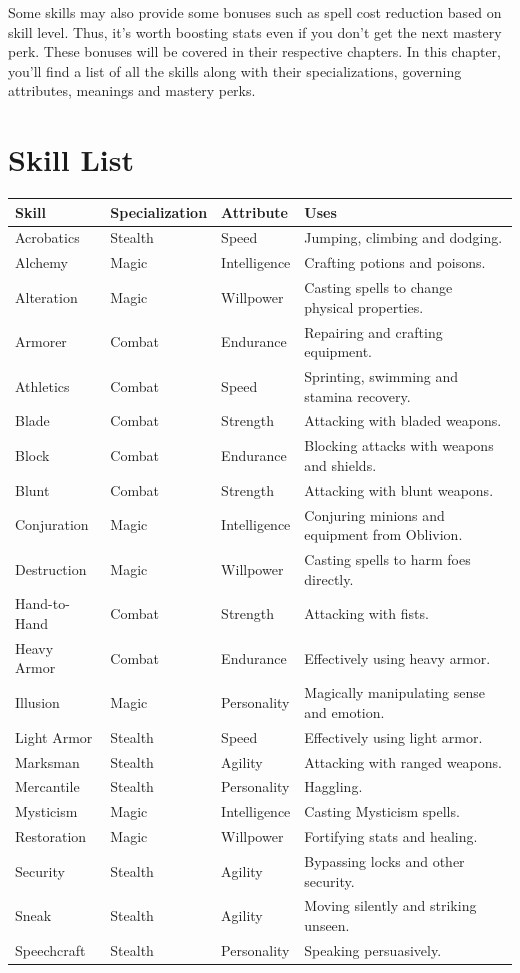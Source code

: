 \documentclass[12pt]{book}
\begin{document}
Some skills may also provide some bonuses such as spell cost reduction based on skill level. Thus, it's worth boosting stats even if you don't get the next mastery perk. These bonuses will be covered in their respective chapters. In this chapter, you'll find a list of all the skills along with their specializations, governing attributes, meanings and mastery perks.

\section{Skill List}

\begin{tabular}{p{}|p{}|p{}|p{}}

Skill & Specialization & Attribute & Uses\\ \hline
Acrobatics & Stealth & Speed & Jumping, climbing and dodging.\\ \hline
Alchemy & Magic & Intelligence & Crafting potions and poisons.\\ \hline
Alteration & Magic & Willpower & Casting spells to change physical properties.\\ \hline
Armorer & Combat & Endurance & Repairing and crafting equipment.\\ \hline
Athletics & Combat & Speed & Sprinting, swimming and stamina recovery.\\ \hline
Blade & Combat & Strength & Attacking with bladed weapons.\\ \hline
Block & Combat & Endurance & Blocking attacks with weapons and shields.\\ \hline
Blunt & Combat & Strength & Attacking with blunt weapons.\\ \hline
Conjuration & Magic & Intelligence & Conjuring minions and equipment from Oblivion.\\ \hline
Destruction & Magic & Willpower & Casting spells to harm foes directly.\\ \hline
Hand-to-Hand & Combat & Strength & Attacking with fists.\\ \hline
Heavy Armor & Combat & Endurance & Effectively using heavy armor.\\ \hline
Illusion & Magic & Personality & Magically manipulating sense and emotion.\\ \hline
Light Armor & Stealth & Speed & Effectively using light armor.\\ \hline
Marksman & Stealth & Agility & Attacking with ranged weapons.\\ \hline
Mercantile & Stealth & Personality & Haggling.\\ \hline
Mysticism & Magic & Intelligence & Casting Mysticism spells.\\ \hline
Restoration & Magic & Willpower & Fortifying stats and healing.\\ \hline
Security & Stealth & Agility & Bypassing locks and other security.\\ \hline
Sneak & Stealth & Agility & Moving silently and striking unseen.\\ \hline
Speechcraft & Stealth & Personality & Speaking persuasively.\\
\end{tabular}
\end{document}
